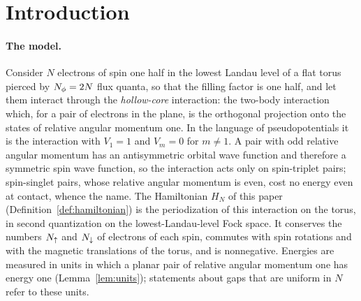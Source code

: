 \section{Introduction}\label{sec:intro}

\paragraph{The model.}
Consider $N$ electrons of spin one half in the lowest Landau level of a flat torus pierced by
$N_{\phi}=2N$ flux quanta, so that the filling factor is one half, and let them interact through the
\emph{hollow-core} interaction: the two-body interaction which, for a pair of electrons in the plane, is
the orthogonal projection onto the states of relative angular momentum one. In the language of
pseudopotentials \cite{Hal83} it is the interaction with $V_1=1$ and $V_m=0$ for $m\neq1$. A pair with odd
relative angular momentum has an antisymmetric orbital wave function and therefore a symmetric spin wave
function, so the interaction acts only on spin-triplet pairs; spin-singlet pairs, whose relative angular
momentum is even, cost no energy even at contact, whence the name. The Hamiltonian $H_N$ of this paper
(Definition~\ref{def:hamiltonian}) is the periodization of this interaction on the torus, in second
quantization on the lowest-Landau-level Fock space. It conserves the numbers $N_{\uparrow}$ and $N_{\downarrow}$ of
electrons of each spin, commutes with spin rotations and with the magnetic translations of the torus, and
is nonnegative. Energies are measured in units in which a planar pair of relative angular momentum one has
energy one (Lemma~\ref{lem:units}); statements about gaps that are uniform in $N$ refer to these units.

